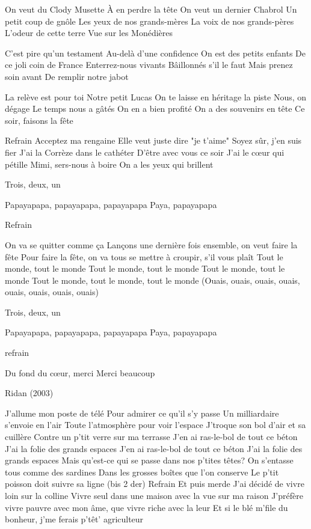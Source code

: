 \beginverse
On veut du Clody Musette
À en perdre la tête
On veut un dernier Chabrol
Un petit coup de gnôle
Les yeux de nos grands-mères
La voix de nos grands-pères
L'odeur de cette terre
Vue sur les Monédières
\endverse

\beginverse
C'est pire qu'un testament
Au-delà d'une confidence
On est des petits enfants
De ce joli coin de France
Enterrez-nous vivants
Bâillonnés s'il le faut
Mais prenez soin avant
De remplir notre jabot
\endverse

\beginverse
La relève est pour toi
Notre petit Lucas
On te laisse en héritage la piste
Nous, on dégage
Le temps nous a gâtés
On en a bien profité
On a des souvenirs en tête
Ce soir, faisons la fête
\endverse

	Refrain
Acceptez ma rengaine
Elle veut juste dire "je t'aime"
Soyez sûr, j'en suis fier
J'ai la Corrèze dans le cathéter
D'être avec vous ce soir
J'ai le cœur qui pétille
Mimi, sers-nous à boire
On a les yeux qui brillent

\beginverse
Trois, deux, un
\endverse

\beginverse
Papayapapa, papayapapa, papayapapa
Paya, papayapapa \\[4x]
\endverse

	Refrain

\beginverse
On va se quitter comme ça
Lançons une dernière fois ensemble, on veut faire la fête
Pour faire la fête, on va tous se mettre à croupir, s'il vous plaît
Tout le monde, tout le monde
Tout le monde, tout le monde
Tout le monde, tout le monde
Tout le monde, tout le monde, tout le monde
(Ouais, ouais, ouais, ouais, ouais, ouais, ouais, ouais)
\endverse

\beginverse
Trois, deux, un
\endverse

\beginverse
Papayapapa, papayapapa, papayapapa
Paya, papayapapa \\[4x]
\endverse

	refrain

\beginverse
Du fond du cœur, merci
Merci beaucoup
\endverse


\beginverse
Ridan (2003)
\endverse

\beginverse
J'allume mon poste de télé
Pour admirer ce qu'il s'y passe
Un milliardaire s'envoie en l'air
Toute l'atmosphère pour voir l'espace
J'troque son bol d'air et sa cuillère
Contre un p'tit verre sur ma terrasse
J'en ai ras-le-bol de tout ce béton
J'ai la folie des grands espaces
J'en ai ras-le-bol de tout ce béton
J'ai la folie des grands espaces
Mais qu'est-ce qui se passe dans nos p'tites têtes?
On s'entasse tous comme des sardines
Dans les grosses boîtes que l'on conserve
Le p'tit poisson doit suivre sa ligne
(bis 2 der)
Refrain
Et puis merde\! J'ai décidé de vivre loin sur la colline
Vivre seul dans une maison avec la vue sur ma raison
J'préfère vivre pauvre avec mon âme, que vivre riche avec la leur
Et si le blé m'file du bonheur, j'me ferais p'têt' agriculteur \\[bis]
\endverse

